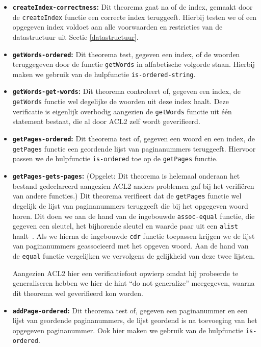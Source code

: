 \begin{itemize}
\item \textbf{\texttt{createIndex-correctness}:} Dit theorema gaat na of de index, gemaakt door de \texttt{createIndex} functie een correcte index teruggeeft. Hierbij testen we of een opgegeven index voldoet aan alle voorwaarden en restricties van de datastructuur uit Sectie \ref{datastructuur}.

\item \textbf{\texttt{getWords-ordered}:} Dit theorema test, gegeven een index, of de woorden teruggegeven door de functie \texttt{getWords} in alfabetische volgorde staan. Hierbij maken we gebruik van de hulpfunctie \texttt{is-ordered-string}.

\item \textbf{\texttt{getWords-get-words}:} Dit theorema controleert of, gegeven een index, de \texttt{getWords} functie wel degelijke de woorden uit deze index haalt. Deze verificatie is eigenlijk overbodig aangezien de \texttt{getWords} functie uit één statement bestaat, die al door ACL2 zelf wordt geverifieerd.

\item \textbf{\texttt{getPages-ordered}:} Dit theorema test of, gegeven een woord en een index, de \texttt{getPages} functie een geordende lijst van paginanummers teruggeeft. Hiervoor passen we de hulpfunctie \texttt{is-ordered} toe op de \texttt{getPages} functie.

\item \textbf{\texttt{getPages-gets-pages}:} (Opgelet: Dit theorema is helemaal onderaan het bestand gedeclareerd aangezien ACL2 anders problemen gaf bij het verifiëren van andere functies.) Dit theorema verifieert dat de \texttt{getPages} functie wel degelijk de lijst van paginanummers teruggeeft die bij het opgegeven woord horen. Dit doen we aan de hand van de ingebouwde \texttt{assoc-equal} functie, die gegeven een sleutel, het bijhorende sleutel en waarde paar uit een \texttt{alist} haalt~\cite{ASSOC8:online}. Als we hierna de ingebouwde \texttt{cdr} functie toepassen krijgen we de lijst van paginanummers geassocieerd met het opgeven woord. Aan de hand van de \texttt{equal} functie vergelijken we vervolgens de gelijkheid van deze twee lijsten.

Aangezien ACL2 hier een verificatiefout opwierp omdat hij probeerde te generaliseren hebben we hier de hint ``do not generalize'' meegegeven, waarna dit theorema wel geverifieerd kon worden.

\item \textbf{\texttt{addPage-ordered}:} Dit theorema test of, gegeven een paginanummer en een lijst van geordende paginanummers, de lijst geordend is na toevoeging van het opgegeven paginanummer. Ook hier maken we gebruik van de hulpfunctie \texttt{is-ordered}.


\end{itemize}
